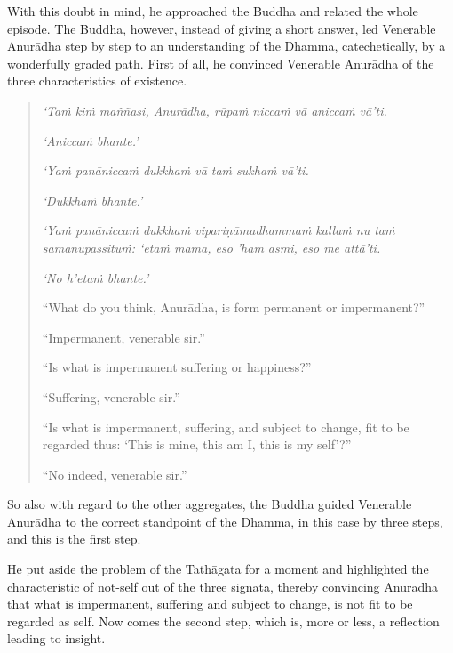 With this doubt in mind, he approached the Buddha and related the whole episode. The Buddha, however, instead of giving a short answer, led Venerable Anurādha step by step to an understanding of the Dhamma, catechetically, by a wonderfully graded path. First of all, he convinced Venerable Anurādha of the three characteristics of existence.

\begin{quote}
\emph{`Taṁ kiṁ maññasi, Anurādha, rūpaṁ niccaṁ vā aniccaṁ vā'ti.}

\emph{`Aniccaṁ bhante.'}

\emph{`Yaṁ panāniccaṁ dukkhaṁ vā taṁ sukhaṁ vā'ti.}

\emph{`Dukkhaṁ bhante.'}

\emph{`Yaṁ panāniccaṁ dukkhaṁ vipariṇāmadhammaṁ kallaṁ nu taṁ samanupassituṁ: `etaṁ mama, eso 'ham asmi, eso me attā'ti.}

\emph{`No h'etaṁ bhante.'}

``What do you think, Anurādha, is form permanent or impermanent?''

``Impermanent, venerable sir.''

``Is what is impermanent suffering or happiness?''

``Suffering, venerable sir.''

``Is what is impermanent, suffering, and subject to change, fit to be regarded thus: `This is mine, this am I, this is my self'?''

``No indeed, venerable sir.''
\end{quote}

So also with regard to the other aggregates, the Buddha guided Venerable Anurādha to the correct standpoint of the Dhamma, in this case by three steps, and this is the first step.

He put aside the problem of the Tathāgata for a moment and highlighted the characteristic of not-self out of the three signata, thereby convincing Anurādha that what is impermanent, suffering and subject to change, is not fit to be regarded as self. Now comes the second step, which is, more or less, a reflection leading to insight.

